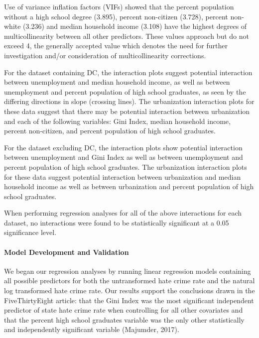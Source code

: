 \documentclass[
]{article}
\begin{document}
Use of variance inflation factors (VIFs) showed that the percent
population without a high school degree (3.895), percent non-citizen
(3.728), percent non-white (3.236) and median household income (3.108)
have the highest degrees of multicollinearity between all other
predictors. These values approach but do not exceed 4, the generally
accepted value which denotes the need for further investigation and/or
consideration of multicollinearity corrections.

For the dataset containing DC, the interaction plots suggest potential
interaction between unemployment and median household income, as well as
between unemployment and percent population of high school graduates, as
seen by the differing directions in slope (crossing lines). The
urbanization interaction plots for these data suggest that there may be
potential interaction between urbanization and each of the following
variables: Gini Index, median household income, percent non-citizen, and
percent population of high school graduates.

For the dataset excluding DC, the interaction plots show potential
interaction between unemployment and Gini Index as well as between
unemployment and percent population of high school graduates. The
urbanization interaction plots for these data suggest potential
interaction between urbanization and median household income as well as
between urbanization and percent population of high school graduates.

When performing regression analyses for all of the above interactions
for each dataset, no interactions were found to be statistically
significant at a 0.05 significance level.

\hypertarget{model-development-and-validation-1}{%
\paragraph{Model Development and
Validation}\label{model-development-and-validation-1}}

We began our regression analyses by running linear regression models
containing all possible predictors for both the untransformed hate crime
rate and the natural log transformed hate crime rate. Our results
support the conclusions drawn in the FiveThirtyEight article: that the
Gini Index was the most significant independent predictor of state hate
crime rate when controlling for all other covariates and that the
percent high school graduates variable was the only other statistically
and independently significant variable (Majumder, 2017).
\end{document}
